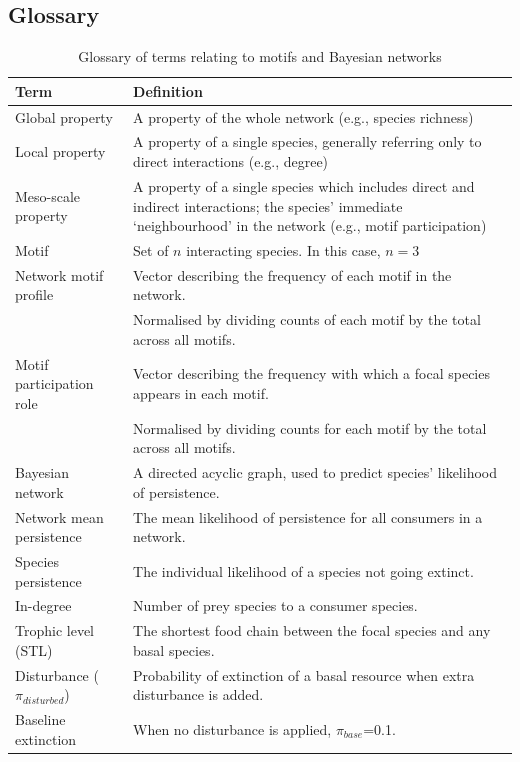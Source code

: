 \documentclass[12pt]{article}
\begin{document}
\begin{spacing}{2.0}
\clearpage

\section{Glossary}

 \begin{table}[hb!]
 \label{glossary}
 \caption{Glossary of terms relating to motifs and Bayesian networks}
     \footnotesize{
 \begin{tabular}{l|m{11cm}}
     Term & Definition \\
     \hline
     Global property & A property of the whole network (e.g., species richness) \\
     Local property & A property of a single species, generally referring only to direct interactions (e.g., degree) \\
     Meso-scale property &  A property of a single species which includes direct and indirect interactions; the species' immediate `neighbourhood' in the network (e.g., motif participation) \\
     Motif & Set of $n$ interacting species. In this case, $n=3$ \\
     Network motif profile & Vector describing the frequency of each motif in the network. \\
     & Normalised by dividing counts of each motif by the total across all motifs.\\
     Motif participation role & Vector describing the frequency with which a focal species appears in each motif.\\
     & Normalised by dividing counts for each motif by the total across all motifs. \\
     Bayesian network & A directed acyclic graph, used to predict species' likelihood of persistence. \\
     Network mean persistence & The mean likelihood of persistence for all consumers in a network.\\
     Species persistence & The individual likelihood of a species not going extinct.\\
     In-degree & Number of prey species to a consumer species.\\
     Trophic level (STL) & The shortest food chain between the focal species and any basal species.\\
     Disturbance ($\pi_{disturbed}$) & Probability of extinction of a basal resource when extra disturbance is added. \\
     Baseline extinction &  When no disturbance is applied, $\pi_{base}$=0.1.\\
 \end{tabular}}
 \end{table}
 
\clearpage 

 

\end{spacing}
\end{document}
